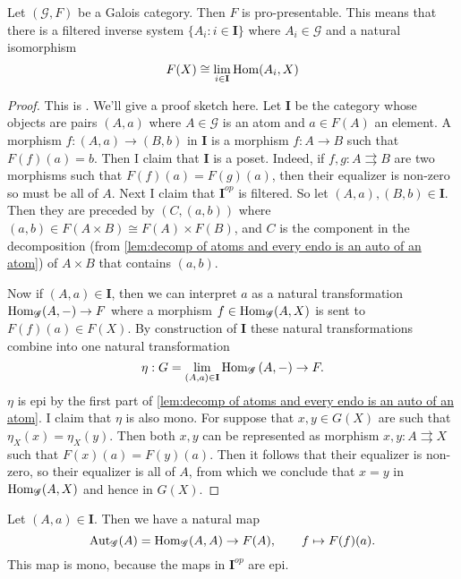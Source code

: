 \begin{proposition}
\label{prop:the fiber functor is pro-representable}
Let $(\mathscr{G},F)$ be a Galois category. Then $F$ is pro-presentable. This means that there is a filtered inverse system $\{A_i : i \in \mathbf{I}\}$ where $A_i \in \mathscr{G}$ and a natural isomorphism
\[ F(X) \cong \lim_{i \in \mathbf{I}} \operatorname{Hom}(A_i, X) \]
\end{proposition}
\begin{proof}
This is \cite[Proposition 8.45]{johnstone77}. We'll give a proof sketch here.
Let $\mathbf{I}$ be the category whose objects are pairs $(A,a)$ where $A \in \mathscr{G}$ is an atom and $a \in F(A)$ an element. A morphism $f : (A,a) \to (B,b)$ in $\mathbf{I}$ is a morphism $f : A \to B$ such that $F(f)(a) = b$. Then I claim that $\mathbf{I}$ is a poset. Indeed, if $f,g : A \rightrightarrows B$ are two morphisms such that $F(f)(a) = F(g)(a)$, then their equalizer is non-zero so must be all of $A$. Next I claim that $\mathbf{I}^{op}$ is filtered. So let $(A,a), (B,b) \in \mathbf{I}$. Then they are preceded by $(C,(a,b))$ where $(a,b) \in F(A \times B) \cong F(A) \times F(B)$, and $C$ is the component in the decomposition (from \cref{lem:decomp of atoms and every endo is an auto of an atom}) of $A \times B$ that contains $(a,b)$.

Now if $(A,a) \in \mathbf{I}$, then we can interpret $a$ as a natural transformation $\operatorname{Hom}_{\mathscr{G}}(A,-) \to F$ where a morphism $f \in \operatorname{Hom}_{\mathscr{G}}(A,X)$ is sent to $F(f)(a) \in F(X)$. By construction of $\mathbf{I}$ these natural transformations combine into one natural transformation
\[ \eta : G = \lim_{(A,a) \in \mathbf{I}}\operatorname{Hom}_{\mathscr{G}}\left(A,- \right) \to F. \]
$\eta$ is epi by the first part of \cref{lem:decomp of atoms and every endo is an auto of an atom}. I claim that $\eta$ is also mono. For suppose that $x,y \in G(X)$ are such that $\eta_X(x) = \eta_X(y)$. Then both $x,y$ can be represented as morphism $x,y :A \rightrightarrows X$ such that $F(x)(a) = F(y)(a)$. Then it follows that their equalizer is non-zero, so their equalizer is all of $A$, from which we conclude that $x=y$ in $\operatorname{Hom}_{\mathscr{G}}(A,X)$ and hence in $G(X)$.
\end{proof}

Let $(A,a) \in \mathbf{I}$. Then we have a natural map
\begin{equation}
\label{eq:the Galois map}
\operatorname{Aut}_{\mathscr{G}}(A) = \operatorname{Hom}_{\mathscr{G}}(A,A) \to F(A), \qquad f \mapsto F(f)(a).
\end{equation}
This map is mono, because the maps in $\mathbf{I}^{op}$ are epi.

